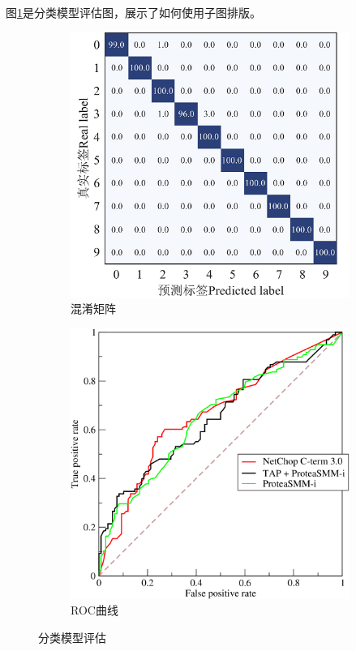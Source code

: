 \documentclass{JYU} %
\begin{document}
图\ref{fig_eval}是分类模型评估图，展示了如何使用子图排版。
\begin{figure}[!htbp]
	\centering
	\begin{subfigure}[b]{0.45\textwidth}
		\includegraphics[width=\textwidth]{./图片/论文图片/fig_confusion.png}
		\caption{混淆矩阵}
	\end{subfigure}
	\begin{subfigure}[b]{0.45\textwidth}
		\includegraphics[width=\textwidth]{./图片/论文图片/fig_roc.png}
		\caption{ROC曲线}
	\end{subfigure}
	\caption{分类模型评估}
	\label{fig_eval}
\end{figure}
\end{document}
